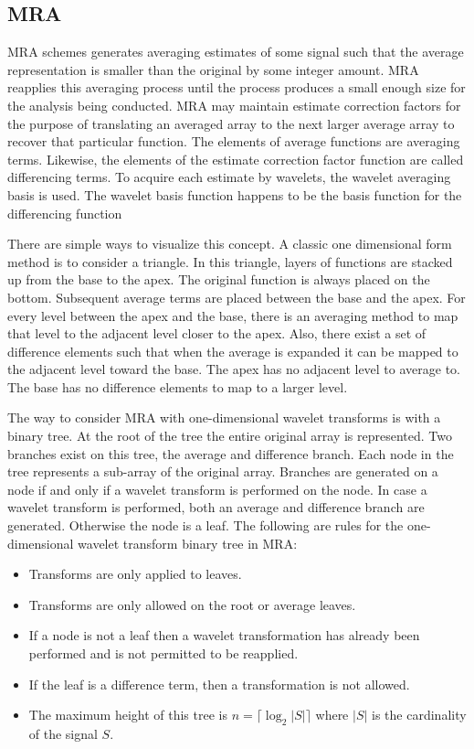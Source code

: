 \subsection{MRA} 

MRA schemes generates averaging estimates of some signal such that the
average representation is smaller than the original by some integer
amount.  MRA reapplies this averaging process until the process
produces a small enough size for the analysis being conducted.  MRA
may maintain estimate correction factors for the purpose of
translating an averaged array to the next larger average array to
recover that particular function.  The elements of average functions
are averaging terms.  Likewise, the elements of the estimate
correction factor function are called differencing terms.  To acquire
each estimate by wavelets, the wavelet averaging basis is used.  The
wavelet basis function happens to be the basis function for the
differencing function

There are simple ways to visualize this concept.  A classic one
dimensional form method is to consider a triangle.  In this triangle,
layers of functions are stacked up from the base to the apex.  The
original function is always placed on the bottom.  Subsequent average
terms are placed between the base and the apex.  For every level
between the apex and the base, there is an averaging method to map
that level to the adjacent level closer to the apex.  Also, there
exist a set of difference elements such that when the average is
expanded it can be mapped to the adjacent level toward the base.  The
apex has no adjacent level to average to.  The base has no difference
elements to map to a larger level.

The way to consider MRA with one-dimensional wavelet transforms is with a binary tree.  At the root of the tree the entire original array is represented.  Two branches exist on this tree, the average and difference branch.  Each node in the tree represents a sub-array of the original array.   Branches are generated on a node if and only if a wavelet transform is performed on the node.  In case a wavelet transform is performed, both an average and difference branch are generated.  Otherwise the node is a leaf.  The following are rules for the one-dimensional wavelet transform binary tree in MRA:
\begin{itemize}
\item Transforms are only applied to leaves.
\item Transforms are only allowed on the root or average leaves.
\item If a node is not a leaf then a wavelet transformation has already been performed and is not permitted to be reapplied.
\item If the leaf is a difference term, then a transformation is not allowed.
\item The maximum height of this tree is $n = \lceil \log_2 \left|S\right| \rceil$ where $\left|S\right|$ is the cardinality of the signal $S$.
\end{itemize}   


